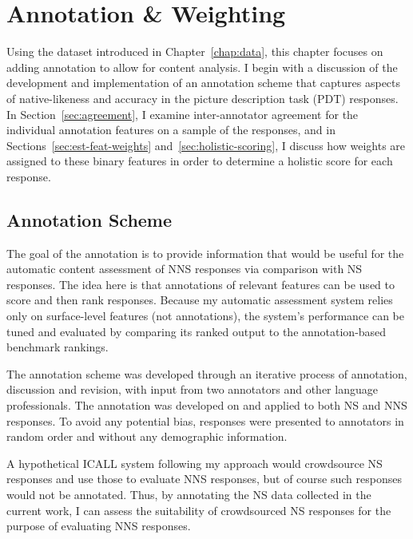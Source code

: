 \chapter{Annotation \& Weighting}
\label{chap:annotation}

Using the dataset introduced in Chapter~\ref{chap:data}, this chapter focuses on adding annotation to allow for content analysis. I begin with a discussion of the development and implementation of an annotation scheme that captures aspects of native-likeness and accuracy in the picture description task (PDT) responses. In Section~\ref{sec:agreement}, I examine inter-annotator agreement for the individual annotation features on a sample of the responses, and in Sections~\ref{sec:est-feat-weights} and~\ref{sec:holistic-scoring}, I discuss how weights are assigned to these binary features in order to determine a holistic score for each response.

\section{Annotation Scheme}
\label{sec:scheme}
The goal of the annotation is to provide information that would be useful for the automatic content assessment of NNS responses via comparison with NS responses. The idea here is that annotations of relevant features can be used to score and then rank responses. Because my automatic assessment system relies only on surface-level features (not annotations), the system's performance can be tuned and evaluated by comparing its ranked output to the annotation-based benchmark rankings.
%

The annotation scheme was developed through an iterative process of annotation, discussion and revision, with input from two annotators and other language professionals. The annotation was developed on and applied to both NS and NNS responses. To avoid any potential bias, responses were presented to annotators in random order and without any demographic information.

A hypothetical ICALL system following my approach would crowdsource NS responses and use those to evaluate NNS responses, but of course such responses would not be annotated. Thus, by annotating the NS data collected in the current work, I can assess the suitability of crowdsourced NS responses for the purpose of evaluating NNS responses. 

